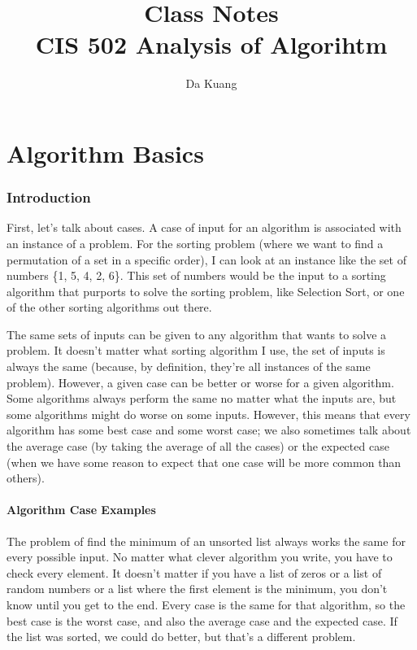 \documentclass[en,hazy,blue,screen,14pt]{elegantnote}
\title{Class Notes\\CIS 502 Analysis of Algorihtm}
\author{Da Kuang}
\institute{University of Pennsylvania}
\date{}
\begin{document}
\maketitle
\newpage
\part{Algorithm Basics}

\section{Introduction}

First, let's talk about cases. A case of input for an algorithm is
associated with an instance of a problem. For the sorting problem
(where we want to find a permutation of a set in a specific order),
I can look at an instance like the set of numbers \{1, 5, 4, 2, 6\}.
This set of numbers would be the input to a sorting algorithm that
purports to solve the sorting problem, like Selection Sort, or one
of the other sorting algorithms out there. 

The same sets of inputs can be given to any algorithm that wants to
solve a problem. It doesn't matter what sorting algorithm I use, the
set of inputs is always the same (because, by definition, they're
all instances of the same problem). However, a given case can be better
or worse for a given algorithm. Some algorithms always perform the
same no matter what the inputs are, but some algorithms might do worse
on some inputs. However, this means that every algorithm has some
best case and some worst case; we also sometimes talk about the average
case (by taking the average of all the cases) or the expected case
(when we have some reason to expect that one case will be more common
than others).


\subsection{Algorithm Case Examples }

The problem of \textquotedbl find the minimum of an unsorted list\textquotedbl{}
always works the same for every possible input. No matter what clever
algorithm you write, you have to check every element. It doesn't matter
if you have a list of zeros or a list of random numbers or a list
where the first element is the minimum, you don't know until you get
to the end. Every case is the same for that algorithm, so the best
case is the worst case, and also the average case and the expected
case. If the list was sorted, we could do better, but that's a different
problem.
\end{document}
